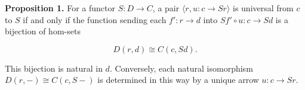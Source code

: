 \textbf{Proposition 1.} For a functor $S: D \to C$, a pair $\langle r, u: c \to Sr \rangle$ is universal from $c$ to $S$ if and only if the function sending each $f': r \to d$ into $Sf' \circ u: c \to Sd$ is a bijection of hom-sets

\[
D(r, d) \cong C(c, Sd).
\]

This bijection is natural in $d$. Conversely, each natural isomorphism $D(r, -) \cong C(c, S -)$ is determined in this way by a unique arrow $u: c \to Sr$.
